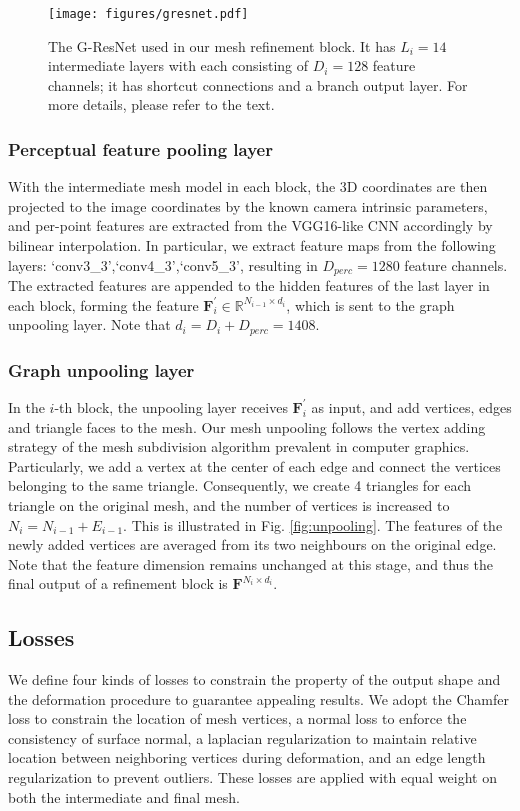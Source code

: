 \documentclass[runningheads]{llncs}
\def\bfF{\mathbf{F}}
\def\bbR{\mathbb{R}}
\newcommand{\figref}[1]{Fig. \ref{#1}}
\begin{document}
\begin{figure}[tbhp]
\centering
\texttt{[image: figures/gresnet.pdf]}
\caption{The G-ResNet used in our mesh refinement block. It has $L_i=14$ intermediate layers with each consisting of $D_i=128$ feature channels; it has shortcut connections and a branch output layer. For more details, please refer to the text.}
\label{fig:gresnet}
\end{figure}

\subsubsection{Perceptual feature pooling layer}
With the intermediate mesh model in each block, the 3D coordinates are then projected to the image coordinates by the known camera intrinsic parameters, and per-point features are extracted from the VGG16-like CNN accordingly by bilinear interpolation. In particular, we extract feature maps from the following layers: `conv3\_3',`conv4\_3',`conv5\_3', resulting in $D_{perc}=1280$ feature channels. The extracted features are appended to the hidden features of the last layer in each block, forming the feature $\bfF^\prime_{i}\in\bbR^{N_{i-1}\times d_i}$, which is sent to the graph unpooling layer. Note that $d_i=D_i+D_{perc}=1408$.

\subsubsection{Graph unpooling layer}
In the $i$-th block, the unpooling layer receives $\bfF^\prime_i$ as input, and add vertices, edges and triangle faces to the mesh. Our mesh unpooling follows the vertex adding strategy of the mesh subdivision algorithm prevalent in computer graphics. Particularly, we add a vertex at the center of each edge and connect the vertices belonging to the same triangle. Consequently, we create 4 triangles for each triangle on the original mesh, and the number of vertices is increased to $N_i=N_{i-1}+E_{i-1}$. This is illustrated in \figref{fig:unpooling}. The features of the newly added vertices are averaged from its two neighbours on the original edge. Note that the feature dimension remains unchanged at this stage, and thus the final output of a refinement block is $\bfF^{N_i\times d_i}$.
\fi



\subsection{Losses}
We define four kinds of losses to constrain the property of the output shape and the deformation procedure to guarantee appealing results.
We adopt the Chamfer loss \cite{FanSG16} to constrain the location of mesh vertices, a normal loss to enforce the consistency of surface normal, a laplacian regularization to maintain relative location between neighboring vertices during deformation, and an edge length regularization to prevent outliers. 
These losses are applied with equal weight on both the intermediate and final mesh.
\end{document}
